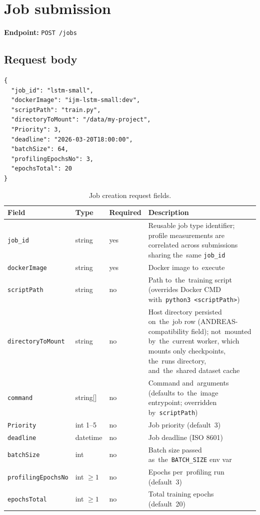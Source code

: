 \section{Job submission}

\textbf{Endpoint:} \texttt{POST /jobs}

\subsection{Request body}

\begin{lstlisting}[language={}, numbers=none]
{
  "job_id": "lstm-small",
  "dockerImage": "ijm-lstm-small:dev",
  "scriptPath": "train.py",
  "directoryToMount": "/data/my-project",
  "Priority": 3,
  "deadline": "2026-03-20T18:00:00",
  "batchSize": 64,
  "profilingEpochsNo": 3,
  "epochsTotal": 20
}
\end{lstlisting}

\begin{table}[H]
\centering
\begin{tabularx}{\textwidth}{@{}l l l X@{}}
\toprule
\textbf{Field} & \textbf{Type} & \textbf{Required} & \textbf{Description} \\
\midrule
\texttt{job\_id}            & string       & yes & Reusable job type identifier; profile measurements are correlated across submissions sharing the~same \texttt{job\_id} \\
\texttt{dockerImage}        & string       & yes & Docker image to~execute \\
\texttt{scriptPath}         & string       & no  & Path to~the~training script (overrides Docker CMD with~\texttt{python3 <scriptPath>}) \\
\texttt{directoryToMount}   & string       & no  & Host directory persisted on~the~job row (ANDREAS-compatibility field); not~mounted by~the~current worker, which mounts only checkpoints, the~runs directory, and~the~shared dataset cache \\
\texttt{command}            & string[]     & no  & Command and~arguments (defaults to~the~image entrypoint; overridden by~\texttt{scriptPath}) \\
\texttt{Priority}           & int 1--5     & no  & Job priority (default~3) \\
\texttt{deadline}           & datetime     & no  & Job deadline (ISO 8601) \\
\texttt{batchSize}          & int          & no  & Batch size passed as~the~\texttt{BATCH\_SIZE} env var \\
\texttt{profilingEpochsNo}  & int $\geq 1$ & no  & Epochs per~profiling run (default~3) \\
\texttt{epochsTotal}        & int $\geq 1$ & no  & Total training epochs (default~20) \\
\bottomrule
\end{tabularx}
\caption{Job creation request fields.}\label{tab:job-create}
\end{table}

